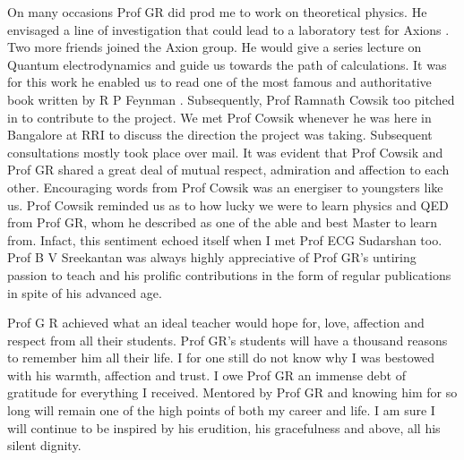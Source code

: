 On many occasions Prof GR did prod me to work on theoretical physics. He
envisaged a line of investigation that could lead to a laboratory test for Axions
\cite{chap22-key17}. Two more friends joined the Axion group. He would give a series lecture
on Quantum electrodynamics and guide us towards the path of calculations. It
was for this work he enabled us to read one of the most famous and authoritative
book written by R P Feynman \cite{chap22-key18}. Subsequently, Prof Ramnath Cowsik too
pitched in to contribute to the project. We met Prof Cowsik whenever he was here
in Bangalore at RRI to discuss the direction the project was taking. Subsequent
consultations mostly took place over mail. It was evident that Prof Cowsik and
Prof GR shared a great deal of mutual respect, admiration and affection to each
other. Encouraging words from Prof Cowsik was an energiser to youngsters like
us. Prof Cowsik reminded us as to how lucky we were to learn physics and QED
from Prof GR, whom he described as one of the able and best Master to learn
from. Infact, this sentiment echoed itself when I met Prof ECG Sudarshan too.
Prof B V Sreekantan was always highly appreciative of Prof GR's untiring
passion to teach and his prolific contributions in the form of regular publications
in spite of his advanced age.

Prof G R achieved what an ideal teacher would hope for, love, affection and
respect from all their students. Prof GR's students will have a thousand reasons
to remember him all their life. I for one still do not know why I was bestowed
with his warmth, affection and trust. I owe Prof GR an immense debt of gratitude
for everything I received. Mentored by Prof GR and knowing him for so long will
remain one of the high points of both my career and life. I am sure I will continue
to be inspired by his erudition, his gracefulness and above, all his silent dignity.

